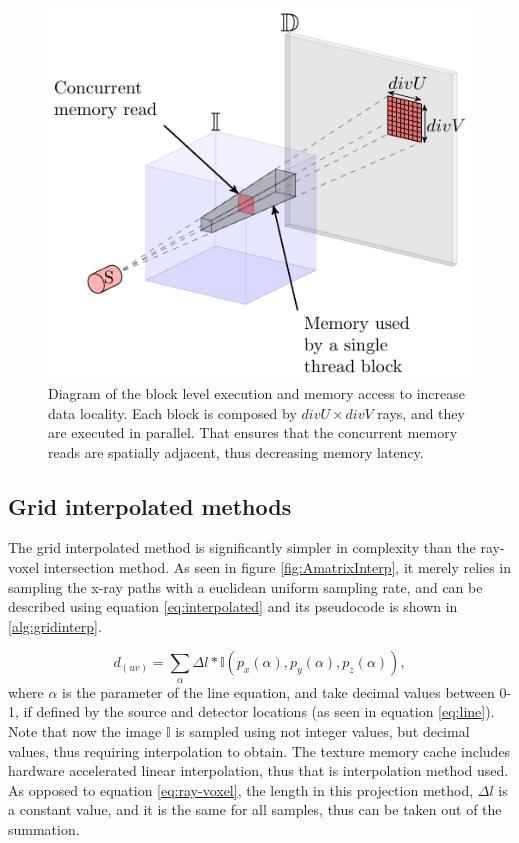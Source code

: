 \begin{figure}
\begin{center}

\includegraphics{GPUmethods/threadblocks-figure0.pdf} 
\end{center}

\caption{\label{fig:block} Diagram of the block level execution and memory access to increase data locality. Each block is composed by $divU\times divV$ rays, and they are executed in parallel. That ensures that the concurrent memory reads are spatially adjacent, thus decreasing memory latency.} 
\end{figure}




\subsection{Grid interpolated methods}

The grid interpolated method is significantly simpler in complexity than the ray-voxel intersection method. As seen in figure \ref{fig:AmatrixInterp}, it merely relies in sampling the x-ray paths with a euclidean uniform sampling rate, and can be described using equation \ref{eq:interpolated} and its pseudocode is shown in \ref{alg:gridinterp}.

\begin{equation}
d_{(uv)}= \sum_{\alpha}\Delta l*\mathbb{I}(p_x(\alpha),p_y(\alpha),p_z(\alpha)),
\label{eq:interpolated}
\end{equation}
where $\alpha$ is the parameter of the line equation, and take decimal values between 0-1, if defined by the source and detector locations (as seen in equation \ref{eq:line}). Note that now the image $\mathbb{I}$ is sampled using not integer values, but decimal values, thus requiring interpolation to obtain. The texture memory cache includes hardware accelerated linear interpolation, thus that is interpolation method used. As opposed to equation \ref{eq:ray-voxel}, the length in this projection method, $\Delta l$ is a constant value, and it is the same for all samples, thus can be taken out of the summation.

